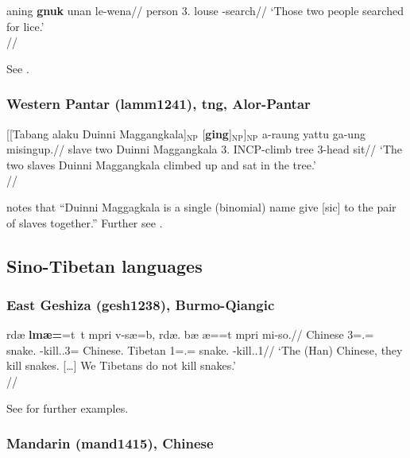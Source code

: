 \documentclass[A4paper]{article}
\newcommand{\unt}[1]{\hbox{}$_\text{#1}$}
\begin{document}
\ex \begingl
\gla aning \textbf{gnuk} unan le-wena//
\glb person 3.\Du{} louse \Appl-search//
\glft `Those two people searched for lice.'\\\citep[472, (75)]{schapperhendery2014}//
\endgl
\xe

See \citet[472]{schapperhendery2014}.


\subsubsection{Western Pantar (lamm1241), \gls{tng}, Alor-Pantar}

\ex 
\begingl
\gla {}[[Tabang alaku Duinni Maggangkala]\unt{NP} [\textbf{ging}]\unt{NP}]\unt{NP} a-raung yattu ga-ung misingup.//
\glb slave two Duinni Maggangkala 3\Pl.\Act{} INCP-climb tree 3\Sg-head sit//
\glft `The two slaves Duinni Maggangkala climbed up and sat in the tree.'\\\citep[53, (105)]{holton2014}//
\endgl
\xe 

\citet[53, fn. 3]{holton2014} notes that ``Duinni Maggagkala is a single (binomial) name give [sic] to the pair of slaves together.''
Further see \citet[53f.]{holton2014}.


\subsection{Sino-Tibetan languages}


\subsubsection{East Geshiza (gesh1238), Burmo-Qiangic} 

\ex 
\begingl
\gla rd\textctz{}\ae{} \textbf{lm\ae{}=\textltailn{}\textschwa}=t\textschwa~t\textschwa{} mpri v-s\ae{}=b\textopeno{}, rd\textctz{}\ae{}. b\ae{} \ng\ae{}=\textltailn{}\textschwa{}=t\textschwa{} mpri mi-so\ng{}.//
\glb Chinese 3=\Pl.\Abs{}=\Top~\Redup{} snake.\Abs{} \Inv-kill.\Npst.3=\Mod{} Chinese.\Abs{} Tibetan 1=\Pl.\Abs{}=\Top{} snake.\Abs{} \Neg{}-kill.\Npst.1\Pl{}//
\glft `The (Han) Chinese, they kill snakes. [\ldots] We Tibetans do not kill snakes.'\\\citep[480, (7.48)]{honkasalo2019}//
\endgl
\xe

See \citet[388, 400, 438, 480, 507, 646]{honkasalo2019} for further examples.

\subsubsection{Mandarin (mand1415), Chinese}
\end{document}
